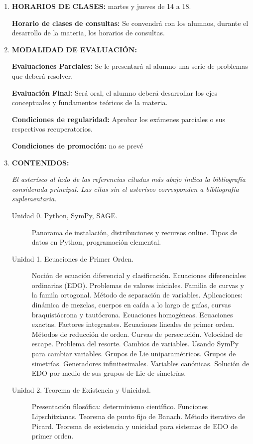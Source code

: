 \begin{enumerate}
\item\textbf{   HORARIOS DE CLASES:} martes y jueves de 14 a 18.


 \textbf{  Horario de clases de consultas:}
	Se convendrá con los alumnos, durante el desarrollo de la materia,
  los horarios de consultas.


\item\textbf{   MODALIDAD DE EVALUACIÓN:}

\textbf{Evaluaciones Parciales:}  Se le presentará al alumno una serie de problemas que deberá resolver.

\textbf{Evaluación Final:} Será oral, el alumno deberá desarrollar los ejes conceptuales y fundamentos teóricos de la materia.

\textbf{  Condiciones de regularidad:}
Aprobar los exámenes parciales o sus respectivos recuperatorios.

\textbf{  Condiciones de promoción:} no se prevé

\item\textbf{ CONTENIDOS:}

\emph{
El asterísco al lado de las referencias citadas más abajo indica la bibliografía considerada principal. Las citas sin el asterísco corresponden a bibliografía suplementaria.}

\begin{description}
 \item[Unidad 0. Python, SymPy, SAGE.] Panorama de instalación, distribuciones y recursos online. Tipos de datos en Python, programación elemental.

\item[Unidad 1. Ecuaciones de Primer Orden.]  Noción de ecuación diferencial y clasificación. Ecuaciones diferenciales ordinarias (EDO).   Problemas de valores iniciales. Familia de curvas y la famila ortogonal. Método de separación de variables. Aplicaciones: dinámica de mezclas, cuerpos en caída a lo largo de guías, curvas braquistócrona y tautócrona. Ecuaciones homogéneas. Ecuaciones exactas. Factores integrantes. Ecuaciones lineales de primer orden. Métodos de reducción de orden. Curvas de persecución. Velocidad de escape. Problema del resorte. Cambios de variables. Usando SymPy para cambiar variables.  Grupos de Lie uniparamétricos. Grupos de simetrías. Generadores infinitesimales. Variables canónicas. Solución de EDO por medio de sus grupos de Lie de simetrías. \cite{simmons_esp, WilliamE.Boyce496,PeterE.Hydon455,S.V.DuzhinB.D.Chebotarevsky465}

\item[Unidad 2. Teorema de Existencia y Unicidad.] Presentación filosófica: determinismo científico. Funciones Lipschitzianas. Teorema de punto fijo de Banach. Método iterativo de Picard. Teorema de existencia y unicidad para sistemas de EDO de primer orden.\cite{simmons_esp, WilliamE.Boyce496, VladimirI.Arnold544, JorgeSotomayor513}


\end{description}
\end{enumerate}
